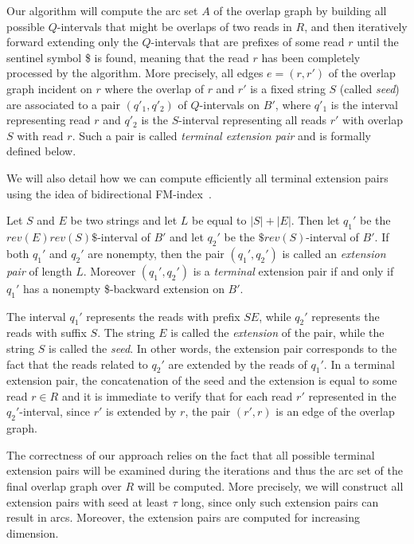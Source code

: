 \documentclass[runningheads,envcountsame,a4paper]{llncs}
\begin{document}
Our algorithm  will compute the arc set $A$  of the overlap graph
by building all possible $Q$-intervals that might be overlaps of two
reads in $R$, and then iteratively forward extending only the $Q$-intervals that
are prefixes of some read $r$ until the sentinel symbol \$ is
found, meaning that the read $r$ has been completely processed by the algorithm.
More precisely,    all edges    $e=(r,r')$ of the overlap graph incident on $r$ where the overlap of $r$ and $r'$ is a fixed string $S$ (called {\em seed}) are  associated to a pair  $(q'_1, q'_2)$ of $Q$-intervals on $B'$,
where $q'_1$ is the interval  representing   read  $r$ and $q'_2$ is the  $S$-interval representing all reads
 $r'$ with overlap $S$ with read $r$. Such a pair is called {\em terminal extension pair} and is formally defined below.





We will also detail how we can compute efficiently all terminal extension pairs
using the idea of bidirectional FM-index~\cite{Lam2009}.

\begin{definition}\label{def:extension-pair}
Let $S$ and $E$ be two strings and let $L$ be equal to $|S|+|E|$.
Then let $q_{1}'$ be the $rev(E)rev(S)\$$-interval of $B'$ and let  $q_{2}'$ be the $\$rev(S)$-interval of $B'$.
If both $q_{1}'$ and  $q_{2}'$ are nonempty, then the pair  $(q_{1}', q_{2}')$ is called
an \emph{extension pair} of length $L$.
Moreover $(q_{1}', q_{2}')$ is a \emph{terminal} extension pair
if and only if $q_{1}'$ has a nonempty \$-backward extension on $B'$.
\end{definition}

The interval $q_{1}'$ represents   the reads with prefix $SE$, while $q_{2}'$
represents the reads with suffix $S$.
The  string $E$ is called the \emph{extension} of the
pair, while the string $S$ is called the \emph{seed}.
In other words, the extension pair corresponds to the fact that the reads related to $q_{2}'$ are extended by the reads
of $q_{1}'$.
In a terminal extension pair, the concatenation of the seed and the extension is
equal to some read $r \in R$ and it is immediate to verify  that for each read $r'$ represented in the $q_{2}'$-interval, since $r'$ is extended by $r$,
the pair $(r', r)$ is an edge of the overlap graph.


The correctness of our approach relies on the fact that all possible
terminal extension pairs will be examined during the iterations and thus
the arc set of the final overlap  graph over $R$ will be computed.
More precisely, we will construct all extension pairs with seed at least $\tau$ long, since only such extension pairs can result in arcs.
Moreover, the extension pairs are computed for increasing dimension.
\end{document}
